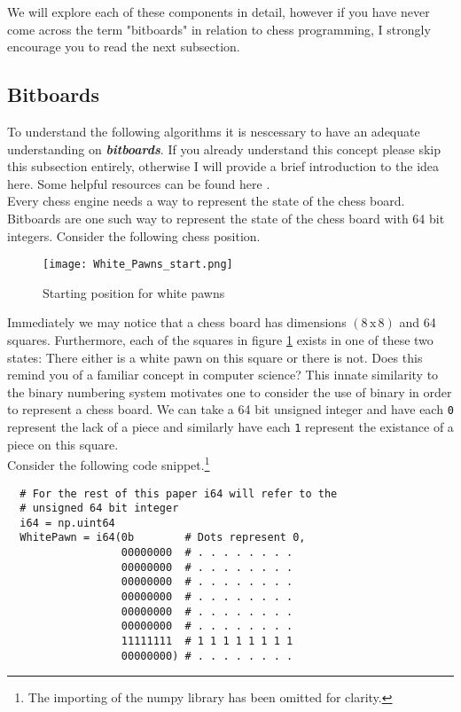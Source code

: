 We will explore each of these components in detail, however 
if you have never come across the term "bitboards" in 
relation to chess programming, I strongly 
encourage you to read the next subsection.

\subsection*{Bitboards}
To understand the following algorithms it is nescessary to 
have an adequate understanding on \textbf{\textit{bitboards}}.
If you already understand this concept please skip this 
subsection entirely, otherwise I will provide a brief 
introduction to the idea here. Some helpful resources can be
found here \cite{bitboards}.\\

Every chess engine needs a way to represent the state of the
chess board. Bitboards are one such way to represent the
state of the chess board with 64 bit integers. Consider
the following chess position.

\begin{figure}[h]
  \texttt{[image: White\_Pawns\_start.png]}
  \centering
  \caption{Starting position for white pawns}
  \label{whitepawns}
\end{figure}

Immediately we may notice that a chess board has dimensions
$(8 \, \textrm{x} \, 8)$ and 64 squares. Furthermore, 
each of the squares in figure \ref{whitepawns} exists 
in one of these two states: There either is a white pawn on
this square or there is not. Does this remind you of a 
familiar concept in computer science? This innate similarity to 
the binary numbering system motivates one to consider the 
use of binary in order to represent a chess board. We can take a 
64 bit unsigned integer and have each \texttt{0} 
represent the lack of a piece and similarly 
have each \texttt{1} represent the existance of a piece on 
this square.\\

Consider the following code snippet.\footnote{The importing
of the numpy library has been omitted for clarity.}

\begin{verbatim}
  # For the rest of this paper i64 will refer to the 
  # unsigned 64 bit integer
  i64 = np.uint64
  WhitePawn = i64(0b        # Dots represent 0,
                  00000000  # . . . . . . . .
                  00000000  # . . . . . . . .
                  00000000  # . . . . . . . .
                  00000000  # . . . . . . . .
                  00000000  # . . . . . . . .
                  00000000  # . . . . . . . .
                  11111111  # 1 1 1 1 1 1 1 1
                  00000000) # . . . . . . . .
\end{verbatim}


